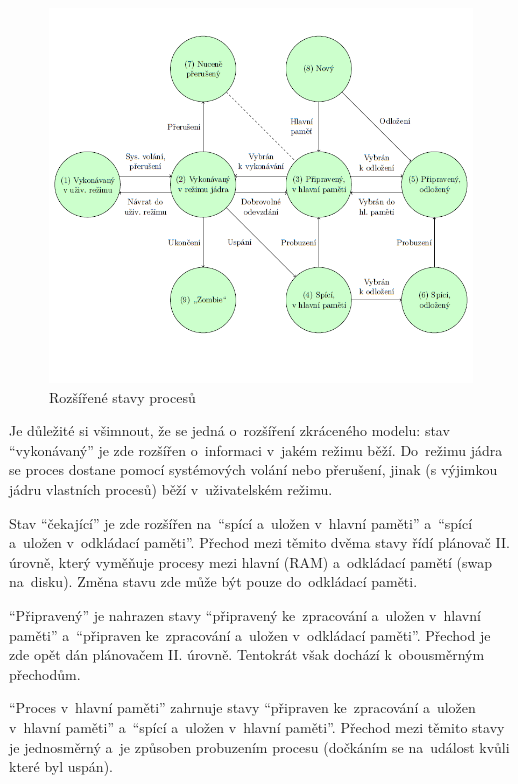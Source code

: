 \begin{figure}[ht]
	\centering
	\includegraphics[width=\textwidth]{images/proc_extended_states.png}
	\caption{Rozšířené stavy procesů}
	\label{proc_extended_states}
\end{figure}

Je důležité si všimnout, že se jedná o~rozšíření zkráceného modelu: stav \enquote{vykonávaný} je zde rozšířen o~informaci v~jakém režimu běží. Do~režimu jádra se proces dostane pomocí systémových volání nebo přerušení, jinak (s výjimkou jádru vlastních procesů) běží v~uživatelském režimu.

Stav \enquote{čekající} je zde rozšířen na~\enquote{spící a~uložen v~hlavní paměti} a~\enquote{spící a~uložen v~odkládací paměti}. Přechod mezi těmito dvěma stavy řídí plánovač II. úrovně, který vyměňuje procesy mezi hlavní (RAM) a~odkládací pamětí (swap na~disku). Změna stavu zde může být pouze do~odkládací paměti.

\enquote{Připravený} je nahrazen stavy \enquote{připravený ke~zpracování a~uložen v~hlavní paměti} a~\enquote{připraven ke~zpracování a~uložen v~odkládací paměti}. Přechod je zde opět dán plánovačem II. úrovně. Tentokrát však dochází k~obousměrným přechodům.

\enquote{Proces v~hlavní paměti} zahrnuje stavy \enquote{připraven ke~zpracování a~uložen v~hlavní paměti} a~\enquote{spící a~uložen v~hlavní paměti}. Přechod mezi těmito stavy je jednosměrný a~je způsoben probuzením procesu (dočkáním se na~událost kvůli které byl uspán).


